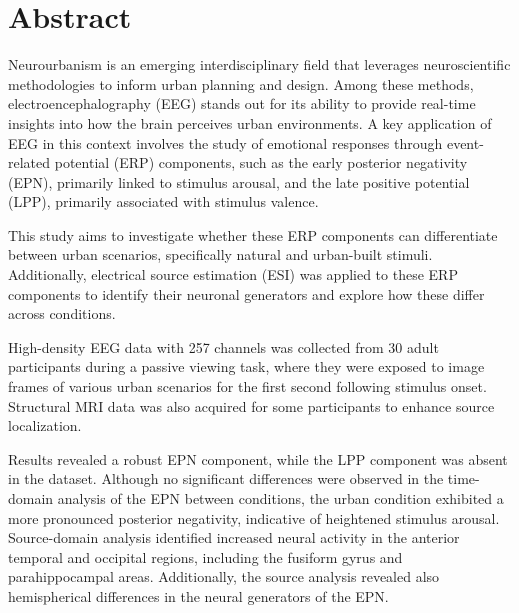 
\section*{Abstract}


Neurourbanism is an emerging interdisciplinary field that leverages neuroscientific methodologies to inform urban planning and design. Among these methods, electroencephalography (EEG) stands out for its ability to provide real-time insights into how the brain perceives urban environments. A key application of EEG in this context involves the study of emotional responses through event-related potential (ERP) components, such as the early posterior negativity (EPN), primarily linked to stimulus arousal, and the late positive potential (LPP), primarily associated with stimulus valence.

This study aims to investigate whether these ERP components can differentiate between urban scenarios, specifically natural and urban-built stimuli. Additionally, electrical source estimation (ESI) was applied to these ERP components to identify their neuronal generators and explore how these differ across conditions.

High-density EEG data with 257 channels was collected from 30 adult participants during a passive viewing task, where they were exposed to image frames of various urban scenarios for the first second following stimulus onset. Structural MRI data was also acquired for some participants to enhance source localization.

Results revealed a robust EPN component, while the LPP component was absent in the dataset. Although no significant differences were observed in the time-domain analysis of the EPN between conditions, the urban condition exhibited a more pronounced posterior negativity, indicative of heightened stimulus arousal. Source-domain analysis identified increased neural activity in the anterior temporal and occipital regions, including the fusiform gyrus and parahippocampal areas. Additionally, the source analysis revealed also hemispherical differences in the neural generators of the EPN.

